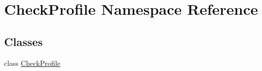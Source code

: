 \hypertarget{namespace_check_profile}{\section{Check\-Profile Namespace Reference}
\label{namespace_check_profile}
}
\subsection*{Classes}
\begin{DoxyCompactItemize}
\item 
class \hyperlink{class_check_profile_1_1_check_profile}{Check\-Profile}
\end{DoxyCompactItemize}
